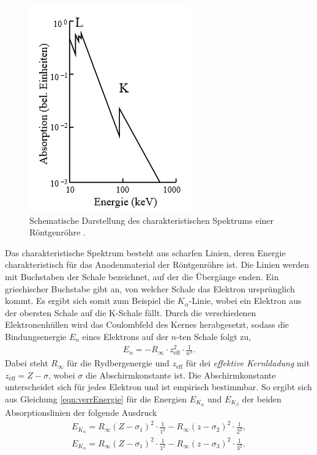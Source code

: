 \begin{figure}[H]
    \centering
    \includegraphics[width = 0.4 \textwidth]{data/absorptionsspektrum.png}
    \caption{Schematische Darstellung des charakteristischen Spektrums einer Röntgenröhre \cite{Anleitung602}.}
    \label{fig:absorptionsverlauf}
\end{figure}
Das charakteristische Spektrum besteht aus scharfen Linien, deren Energie charakteristisch für das Anodenmaterial der Röntgenröhre ist. Die Linien werden mit Buchstaben der Schale bezeichnet, auf der die Übergänge
enden. Ein griechischer Buchstabe gibt an, von welcher Schale das Elektron ursprünglich kommt. Es ergibt sich somit zum Beispiel die $K_\alpha$-Linie, wobei ein Elektron aus der obersten Schale auf die K-Schale fällt. \newline
Durch die verschiedenen Elektronenhüllen wird das Coulombfeld des Kernes herabgesetzt, sodass die Bindungsenergie $E_n$ eines Elektrons auf der $n$-ten Schale folgt zu,
\begin{align}
    \label{eqn:verrEnergie}
    E_n = -R_\infty\cdot z_{\text{eff}}^2\cdot \frac{1}{n^2}.
\end{align}
Dabei steht $R_\infty$ für die Rydbergenergie und $z_{\text{eff}}$ für dei \textit{effektive Kernldadung} mit $z_{\text{eff}} = Z - \sigma$, wobei $\sigma$ die Abschirmkonstante ist.
Die Abschirmkonstante unterscheidet sich für jedes Elektron und ist empirisch bestimmbar. So ergibt sich aus Gleichung \eqref{eqn:verrEnergie} für die Energien $E_{K_\alpha}$ und $E_{K_\beta}$ der beiden Absorptionslinien 
der folgende Ausdruck
\begin{align}
    \label{eqn:ersteEnergie}
    E_{K_\alpha} = R_\infty (Z-\sigma_1)^2\cdot \frac{1}{1^2} - R_\infty (z-\sigma_2)^2 \cdot \frac{1}{2^2}, \\
    \label{eqn:zweiteEnergie}
    E_{K_\alpha} = R_\infty (Z-\sigma_1)^2\cdot \frac{1}{1^2} - R_\infty (z-\sigma_3)^2 \cdot \frac{1}{3^2}. 
\end{align}
